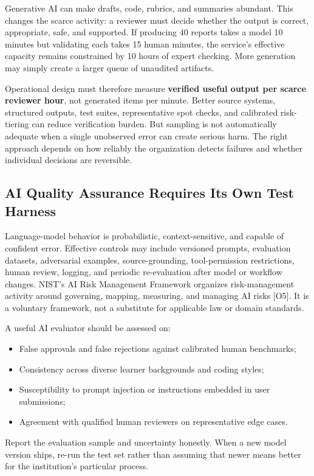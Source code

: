 Generative AI can make drafts, code, rubrics, and summaries abundant. This changes the scarce activity: a reviewer must decide whether the output is correct, appropriate, safe, and supported. If producing 40 reports takes a model 10 minutes but validating each takes 15 human minutes, the service's effective capacity remains constrained by 10 hours of expert checking. More generation may simply create a larger queue of unaudited artifacts.

Operational design must therefore measure \textbf{verified useful output per scarce reviewer hour}, not generated items per minute. Better source systems, structured outputs, test suites, representative spot checks, and calibrated risk-tiering can reduce verification burden. But sampling is not automatically adequate when a single unobserved error can create serious harm. The right approach depends on how reliably the organization detects failures and whether individual decisions are reversible.

\subsection{AI Quality Assurance Requires Its Own Test Harness}
\label{sec:ai_test_harness}

Language-model behavior is probabilistic, context-sensitive, and capable of confident error. Effective controls may include versioned prompts, evaluation datasets, adversarial examples, source-grounding, tool-permission restrictions, human review, logging, and periodic re-evaluation after model or workflow changes. NIST's AI Risk Management Framework organizes risk-management activity around governing, mapping, measuring, and managing AI risks [O5]. It is a voluntary framework, not a substitute for applicable law or domain standards.

A useful AI evaluator should be assessed on:
\begin{itemize}
    \item False approvals and false rejections against calibrated human benchmarks;
    \item Consistency across diverse learner backgrounds and coding styles;
    \item Susceptibility to prompt injection or instructions embedded in user submissions;
    \item Agreement with qualified human reviewers on representative edge cases.
\end{itemize}

Report the evaluation sample and uncertainty honestly. When a new model version ships, re-run the test set rather than assuming that newer means better for the institution's particular process.

